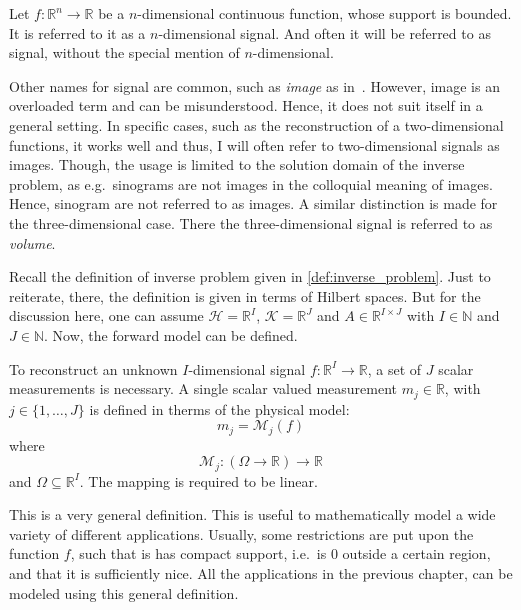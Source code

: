 \begin{definition}[Signal]\label{def:signal}
	Let \(f\colon \mathbb{R}^n \to \mathbb{R}\) be a \(n\)-dimensional continuous function,
	whose support is bounded. It is referred to it as a \(n\)-dimensional signal. And often it
	will be referred to as signal, without the special mention of \(n\)-dimensional.
\end{definition}

Other names for signal are common, such as \textit{image} as in~\cite{herman_basis_2015}. However,
image is an overloaded term and can be misunderstood. Hence, it does not suit itself in a general
setting. In specific cases, such as the reconstruction of a two-dimensional functions, it works well
and thus, I will often refer to two-dimensional signals as images. Though, the usage is limited to
the solution domain of the inverse problem, as e.g.\ sinograms are not images in the colloquial
meaning of images. Hence, sinogram are not referred to as images. A similar distinction is made for
the three-dimensional case. There the three-dimensional signal is referred to as \textit{volume}.

Recall the definition of inverse problem given in \autoref{def:inverse_problem}. Just to reiterate,
there, the definition is given in terms of Hilbert spaces. But for the discussion here, one can
assume \(\mathcal{H} = \mathbb{R}^I\), \(\mathcal{K} = \mathbb{R}^J\) and \(A \in
\mathbb{R}^{I\times J}\) with \(I \in \mathbb{N}\) and \(J \in \mathbb{N}\). Now, the forward model
can be defined.

\begin{definition}\label{def:forward-model}
	To reconstruct an unknown \(I\)-dimensional signal \(f: \mathbb{R}^I \to \mathbb{R}\), a set
	of \(J\) scalar measurements is necessary. A single scalar valued measurement \(m_j \in
	\mathbb{R}\), with \(j \in \{1, \dots, J\}\) is defined in therms of the physical model:
	\[ m_j = \mathscr{M}_j(f)\]
	where
	\[ \mathscr{M}_j\colon (\Omega \to \mathbb{R}) \to \mathbb{R} \]
	and \(\Omega \subseteq \mathbb{R}^I\). The mapping is required to be linear.
\end{definition}

This is a very general definition. This is useful to mathematically model a wide variety of
different applications. Usually, some restrictions are put upon the function \(f\), such that is has
compact support, i.e.\ is \(0\) outside a certain region, and that it is sufficiently nice. All the
applications in the previous chapter, can be modeled using this general definition.

